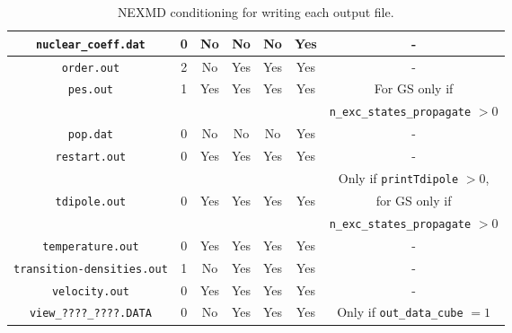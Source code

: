 \begin{center}
\begin{table}
\begin{tabular}{|c|c|c|c|c|c|c|}
	\hline
	\verb+nuclear_coeff.dat+ & 0 & No & No & No & Yes & - \\
	\hline
	\verb+order.out+ & 2 & No & Yes & Yes & Yes & - \\
	\hline
	\verb+pes.out+ & 1 & Yes & Yes & Yes & Yes & For GS only if  \\
	&  &  &  &  &  & \verb+n_exc_states_propagate+ $>0$ \\
	\hline
	\verb+pop.dat+ & 0 & No & No & No & Yes & - \\
	\hline
	\verb+restart.out+ & 0 & Yes & Yes & Yes & Yes & - \\
	\hline
	&  &  &  &  &  & Only if \verb+printTdipole+ $>0$, \\
	\verb+tdipole.out+ & 0 & Yes & Yes & Yes & Yes & for GS only if \\
	&  &  &  &  &  & \verb+n_exc_states_propagate+ $>0$\\
	\hline
	\verb+temperature.out+ & 0 & Yes & Yes & Yes & Yes & - \\
	\hline
	\verb+transition-densities.out+ & 1 & No & Yes & Yes & Yes & - \\
	\hline
	\verb+velocity.out+ & 0 & Yes & Yes & Yes & Yes & - \\
	\hline
	\verb+view_????_????.DATA+ & 0 & No & Yes & Yes & Yes & Only if \verb+out_data_cube+ $=1$ \\
	\hline
\end{tabular}
\caption{\label{TableOutput} NEXMD conditioning for writing each output file.}
\end{table}
\end{center}
